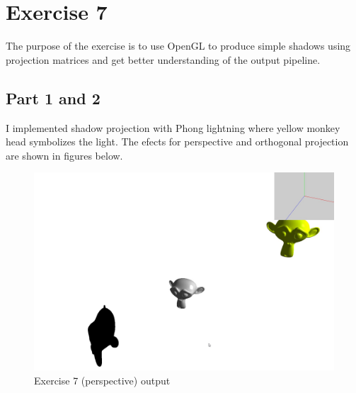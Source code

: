 \chapter{Exercise 7}
The purpose of the exercise is to use OpenGL to produce simple shadows using 
projection matrices and get better understanding of the output pipeline.

\section{Part 1 and 2}
I implemented shadow projection with Phong lightning where yellow monkey head 
symbolizes the light. The efects for perspective and orthogonal projection are
shown in figures below.

\begin{figure}[ht!]
	\begin{center}
		\includegraphics[width=1.0\textwidth]{figures/exercise_7}
	\end{center}
	\vspace{-4.5ex}\caption{Exercise 7 (perspective) output}
	\label{fig:exercise_7} 
\end{figure}

